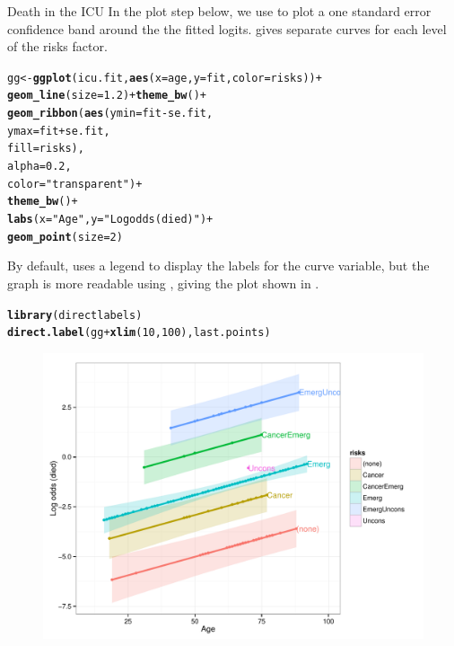 \documentclass[11pt]{book}\usepackage[]{graphicx}\usepackage[]{color}
\makeatletter
\newcommand{\hlnum}[1]{\textcolor[rgb]{0.686,0.059,0.569}{#1}}%
\newcommand{\hlstr}[1]{\textcolor[rgb]{0.192,0.494,0.8}{#1}}%
\newcommand{\hlopt}[1]{\textcolor[rgb]{0,0,0}{#1}}%
\newcommand{\hlstd}[1]{\textcolor[rgb]{0.345,0.345,0.345}{#1}}%
\newcommand{\hlkwb}[1]{\textcolor[rgb]{0.69,0.353,0.396}{#1}}%
\newcommand{\hlkwc}[1]{\textcolor[rgb]{0.333,0.667,0.333}{#1}}%
\newcommand{\hlkwd}[1]{\textcolor[rgb]{0.737,0.353,0.396}{\textbf{#1}}}%
\newenvironment{kframe}{%
 \def\at@end@of@kframe{}%
 \ifinner\ifhmode%
  \def\at@end@of@kframe{\end{minipage}}%
  \begin{minipage}{\columnwidth}%
 \fi\fi%
 \def\FrameCommand##1{\hskip\@totalleftmargin \hskip-\fboxsep
 \colorbox{shadecolor}{##1}\hskip-\fboxsep
     \hskip-\linewidth \hskip-\@totalleftmargin \hskip\columnwidth}%
 \MakeFramed {\advance\hsize-\width
   \@totalleftmargin\z@ \linewidth\hsize
   \@setminipage}}%
 {\par\unskip\endMakeFramed%
 \at@end@of@kframe}
\newenvironment{knitrout}{}{} %
\renewenvironment{knitrout}{\small\renewcommand{\baselinestretch}{.85}}{} %
\makeatother
\begin{document}
\begin{Example}[icu1]{Death in the ICU}
In the plot step below, we use  to plot a one standard
error confidence band around the the fitted logits. 
gives separate curves for each level of the risks factor.

\begin{knitrout}
\color{fgcolor}\begin{kframe}
\begin{alltt}
\hlstd{gg} \hlkwb{<-} \hlkwd{ggplot}\hlstd{( icu.fit,} \hlkwd{aes}\hlstd{(}\hlkwc{x}\hlstd{=age,} \hlkwc{y}\hlstd{=fit,} \hlkwc{color}\hlstd{=risks))} \hlopt{+}
  \hlkwd{geom_line}\hlstd{(}\hlkwc{size} \hlstd{=} \hlnum{1.2}\hlstd{)} \hlopt{+} \hlkwd{theme_bw}\hlstd{()} \hlopt{+}
  \hlkwd{geom_ribbon}\hlstd{(}\hlkwd{aes}\hlstd{(}\hlkwc{ymin} \hlstd{= fit} \hlopt{-} \hlstd{se.fit,}
                  \hlkwc{ymax} \hlstd{= fit} \hlopt{+} \hlstd{se.fit,}
                  \hlkwc{fill} \hlstd{= risks),}
              \hlkwc{alpha} \hlstd{=} \hlnum{0.2}\hlstd{,}
              \hlkwc{color} \hlstd{=} \hlstr{"transparent"}\hlstd{)} \hlopt{+}
  \hlkwd{theme_bw}\hlstd{()} \hlopt{+}
  \hlkwd{labs}\hlstd{(}\hlkwc{x} \hlstd{=} \hlstr{"Age"}\hlstd{,} \hlkwc{y} \hlstd{=} \hlstr{"Log odds (died)"}\hlstd{)} \hlopt{+}
  \hlkwd{geom_point}\hlstd{(}\hlkwc{size}\hlstd{=}\hlnum{2}\hlstd{)}
\end{alltt}
\end{kframe}
\end{knitrout}
By default,  uses a legend to display the labels for the curve
variable, but the graph is more readable using , 
giving the plot shown in .
\begin{knitrout}
\color{fgcolor}\begin{kframe}
\begin{alltt}
\hlkwd{library}\hlstd{(directlabels)}
\hlkwd{direct.label}\hlstd{(gg}\hlopt{+}\hlkwd{xlim}\hlstd{(}\hlnum{10}\hlstd{,}\hlnum{100}\hlstd{), last.points)}
\end{alltt}
\end{kframe}\begin{figure}[!htbp]


\centerline{\includegraphics[width=.75\textwidth]{ch07/fig/icu1-fit-plot-1} }


\end{figure}
\end{knitrout}
\end{Example}
\end{document}
